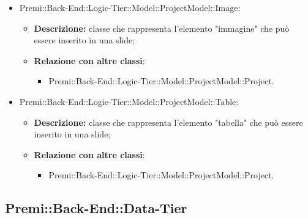 \begin{itemize}
		\item Premi::Back-End::Logic-Tier::Model::ProjectModel::Image:
		\begin{itemize}
			\item \textbf{Descrizione:} classe che rappresenta l'elemento "immagine" che può essere inserito in una slide;
			\item \textbf{Relazione con altre classi}:
			\begin{itemize}
				\item Premi::Back-End::Logic-Tier::Model::ProjectModel::Project.
			\end{itemize}
		\end{itemize}
		
		\item Premi::Back-End::Logic-Tier::Model::ProjectModel::Table:
		\begin{itemize}
			\item \textbf{Descrizione:} classe che rappresenta l'elemento "tabella" che può essere inserito in una slide;
			\item \textbf{Relazione con altre classi}:
			\begin{itemize}
				\item Premi::Back-End::Logic-Tier::Model::ProjectModel::Project.
			\end{itemize}
		\end{itemize}
	\end{itemize}


\subsection{Premi::Back-End::Data-Tier}

